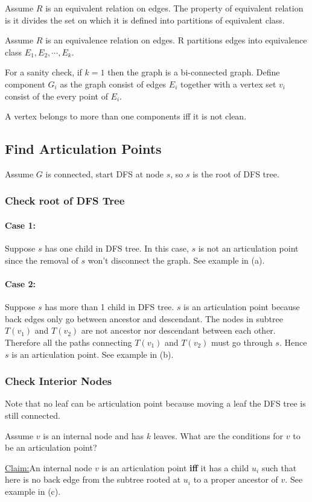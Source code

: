 \documentclass[en,hazy,blue,normal,12pt]{elegantnote}
\newenvironment{claim}[1]{\par\noindent\underline{Claim:}\space#1}{}
\begin{document}
Assume $R$ is an equivalent relation on edges. The property of equivalent 
relation is it divides the set on which it is defined into partitions of 
equivalent class.

Assume $R$ is an equivalence relation on edges. R partitions edges into 
equivalence class $E_1, E_2, \cdots, E_k$. 

For a sanity check, if $k = 1$ then the graph is a bi-connected graph. 
Define component $G_i$ as the graph consist of edges $E_i$ together with a 
vertex set $v_i$ consist of the every point of $E_i$.

A vertex belongs to more than one components iff it is not clean.

\subsection{Find Articulation Points}
Assume $G$ is connected, start DFS at node $s$, so $s$ is the root of DFS tree.

\subsubsection{Check root of DFS Tree}
\paragraph{Case 1:} Suppose $s$ has one child in DFS tree. In this case, $s$ is 
not an articulation point since the removal of $s$ won't disconnect the graph. 
See example in (a).

\paragraph{Case 2:} Suppose $s$ has more than 1 child in DFS tree. $s$ is 
an articulation point because back edges only go between ancestor and 
descendant. The nodes in subtree $T(v_1)$ and $T(v_2)$ are not ancestor nor 
descendant between each other. Therefore all the paths connecting $T(v_1)$ and $T(v_2)$ must go through $s$. Hence $s$ is an articulation point. See example in (b).

\subsubsection{Check Interior Nodes}

Note that no leaf can be articulation point because moving a leaf the DFS tree is still connected.

Assume $v$ is an internal node and has $k$ leaves. What are the conditions for $v$ to be an articulation point? 
\begin{claim}
 An internal node $v$ is an articulation point \textbf{iff} it has a child $u_i$ such that here is no back edge from the subtree rooted at $u_i$ to a proper ancestor of $v$. See example in (c).
\end{claim}
\end{document}
